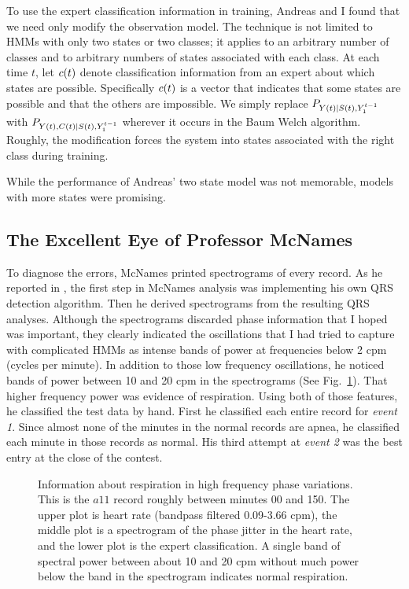 To use the expert classification information in training, Andreas and
I found that we need only modify the observation model.  The technique
is not limited to HMMs with only two states or two classes; it applies
to an arbitrary number of classes and to arbitrary numbers of states
associated with each class.  At each time $t$, let ${c}{(t)}$ denote
classification information from an expert about which states are
possible.  Specifically ${c}{(t)}$ is a vector that indicates that
some states are possible and that the others are impossible.  We
simply replace $P_{{Y}{(t)}|{S}{(t)},Y_{1}^{t-1}}$ with
$P_{{Y}{(t)},{C}{(t)}|{S}{(t)},Y_{1}^{t-1}}$ wherever it occurs
in the Baum Welch algorithm.  Roughly, the modification forces the
system into states associated with the right class during training.

While the performance of Andreas' two state model was not memorable,
models with more states were promising.

\subsection{The Excellent Eye of Professor McNames}
\label{sec:mcnames}

To diagnose the errors, McNames printed spectrograms of every record.
As he reported in \cite{mcnames2000}, the first step in McNames
analysis was implementing his own QRS detection algorithm.  Then he
derived spectrograms from the resulting QRS analyses.  Although the
spectrograms discarded phase information that I hoped was important,
they clearly indicated the oscillations that I had tried to capture
with complicated HMMs as intense bands of power at frequencies below 2
cpm (cycles per minute).%
%
In addition to those low frequency oscillations, he noticed bands of
power between 10 and 20 cpm in the spectrograms (See
Fig.~\ref{fig:sgram}).  That higher frequency power was evidence of
respiration.  Using both of those features, he classified the test
data by hand.  First he classified each entire record for \emph{event
  1}.  Since almost none of the minutes in the normal records are
apnea, he classified each minute in those records as normal.  His
third attempt at \emph{event 2} was the best entry at the close of the
contest.

\begin{figure}
  \caption[Information about respiration in high
  frequency phase variations]%
  {Information about respiration in high frequency phase variations.
    This is the $a11$ record roughly between minutes 00 and 150.  The
    upper plot is heart rate (bandpass filtered 0.09-3.66 cpm), the
    middle plot is a spectrogram of the phase jitter in the heart
    rate, and the lower plot is the expert classification.  A single
    band of spectral power between about 10 and 20 cpm without much
    power below the band in the spectrogram indicates normal
    respiration.}
  \label{fig:sgram}
\end{figure}

